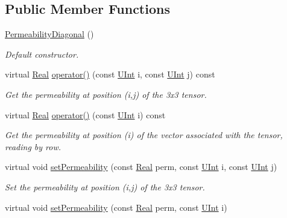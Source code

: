 \subsection*{Public Member Functions}
\begin{DoxyCompactItemize}
\item 
\hyperlink{classFVCode3D_1_1PermeabilityDiagonal_ad545fa18de75bba93f96f8dd892af6ee}{Permeability\+Diagonal} ()
\begin{DoxyCompactList}\small\item\em Default constructor. \end{DoxyCompactList}\item 
virtual \hyperlink{namespaceFVCode3D_a40c1f5588a248569d80aa5f867080e83}{Real} \hyperlink{classFVCode3D_1_1PermeabilityDiagonal_a234aeeebedf1665b8d42193bfe383f2f}{operator()} (const \hyperlink{namespaceFVCode3D_a4bf7e328c75d0fd504050d040ebe9eda}{U\+Int} i, const \hyperlink{namespaceFVCode3D_a4bf7e328c75d0fd504050d040ebe9eda}{U\+Int} j) const 
\begin{DoxyCompactList}\small\item\em Get the permeability at position (i,j) of the 3x3 tensor. \end{DoxyCompactList}\item 
virtual \hyperlink{namespaceFVCode3D_a40c1f5588a248569d80aa5f867080e83}{Real} \hyperlink{classFVCode3D_1_1PermeabilityDiagonal_a039ec55ed880e5ce1290b413dead4284}{operator()} (const \hyperlink{namespaceFVCode3D_a4bf7e328c75d0fd504050d040ebe9eda}{U\+Int} i) const 
\begin{DoxyCompactList}\small\item\em Get the permeability at position (i) of the vector associated with the tensor, reading by row. \end{DoxyCompactList}\item 
virtual void \hyperlink{classFVCode3D_1_1PermeabilityDiagonal_a7303c6758e5ddf4ef12f53fd4f74acca}{set\+Permeability} (const \hyperlink{namespaceFVCode3D_a40c1f5588a248569d80aa5f867080e83}{Real} perm, const \hyperlink{namespaceFVCode3D_a4bf7e328c75d0fd504050d040ebe9eda}{U\+Int} i, const \hyperlink{namespaceFVCode3D_a4bf7e328c75d0fd504050d040ebe9eda}{U\+Int} j)
\begin{DoxyCompactList}\small\item\em Set the permeability at position (i,j) of the 3x3 tensor. \end{DoxyCompactList}\item 
virtual void \hyperlink{classFVCode3D_1_1PermeabilityDiagonal_af853d4e06b6601c725b6f16e919d3f3f}{set\+Permeability} (const \hyperlink{namespaceFVCode3D_a40c1f5588a248569d80aa5f867080e83}{Real} perm, const \hyperlink{namespaceFVCode3D_a4bf7e328c75d0fd504050d040ebe9eda}{U\+Int} i)

\end{DoxyCompactItemize}
